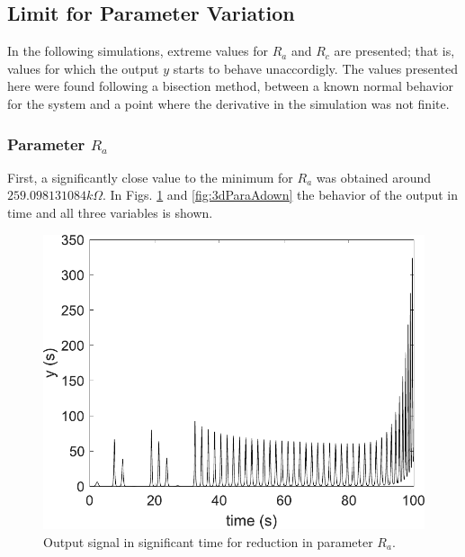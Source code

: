     \subsection{Limit for Parameter Variation}
    In the following simulations, extreme values for $R_a$ and $R_c$ are presented; that is, values for which the output $y$ starts to behave unaccordigly. The values presented here were found following a bisection method, between a known normal behavior for the system and a point where the derivative in the simulation was not finite.
    
    \subsubsection{Parameter \texorpdfstring{$R_a$}{Ra}}\label{subsubsec:ra}
    First, a significantly close value to the minimum for $R_a$ was obtained around $259.098131084k\Omega$. In Figs. \ref{fig:outParaAdown} and \ref{fig:3dParaAdown} the behavior of the output in time and all three variables is shown.
    \begin{figure}[H]
        \centering
        \includegraphics[scale=0.5]{figs/outParaAdown.pdf}
        \caption{Output signal in significant time for reduction in parameter $R_a$.}
        \label{fig:outParaAdown}
    \end{figure}
